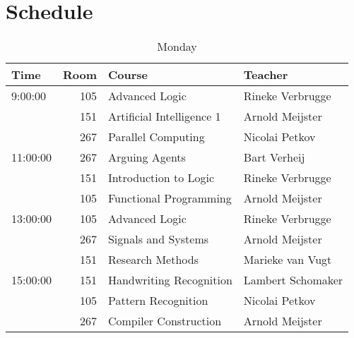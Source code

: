 \section{Schedule}
\label{app:schedule}

\begin{table}
    \centering
    \caption{Monday}
    \begin{tabular}{l|r|l|l}
        Time & Room & Course & Teacher \\ \hline
        \hline
        9:00:00 & 105 & Advanced Logic & Rineke Verbrugge\\
        & 151 & Artificial Intelligence 1 & Arnold Meijster\\
        & 267 & Parallel Computing & Nicolai Petkov\\\hline
        11:00:00 & 267 & Arguing Agents & Bart Verheij\\
        & 151 & Introduction to Logic & Rineke Verbrugge\\
        & 105 & Functional Programming & Arnold Meijster\\\hline
        13:00:00 & 105 & Advanced Logic & Rineke Verbrugge\\
        & 267 & Signals and Systems & Arnold Meijster\\
        & 151 & Research Methods & Marieke van Vugt\\\hline
        15:00:00 & 151 & Handwriting Recognition & Lambert Schomaker\\
        & 105 & Pattern Recognition & Nicolai Petkov\\
        & 267 & Compiler Construction & Arnold Meijster\\
    \end{tabular}
\end{table}

